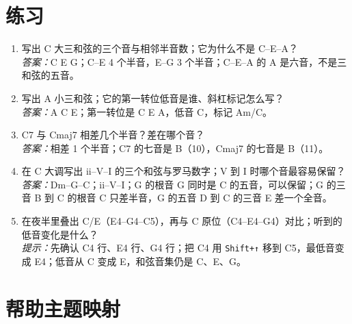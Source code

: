 \section{练习}


\begin{exercise}
\begin{enumerate}
  \item 写出 C 大三和弦的三个音与相邻半音数；它为什么不是 C–E–A？\\
  \emph{答案：}C E G；C–E 4 个半音，E–G 3 个半音；C–E–A 的 A 是六音，不是三和弦的五音。

  \item 写出 A 小三和弦；它的第一转位低音是谁、斜杠标记怎么写？\\
  \emph{答案：}A C E；第一转位是 C E A，低音 C，标记 Am/C。

  \item C7 与 Cmaj7 相差几个半音？差在哪个音？\\
  \emph{答案：}相差 1 个半音；C7 的七音是 B\flatsym（10），Cmaj7 的七音是 B（11）。

  \item 在 C 大调写出 ii–V–I 的三个和弦与罗马数字；V 到 I 时哪个音最容易保留？\\
  \emph{答案：}Dm–G–C；ii–V–I；G 的根音 G 同时是 C 的五音，可以保留；G 的三音 B 到 C 的根音 C 只差半音，G 的五音 D 到 C 的三音 E 差一个全音。

  \item 在夜半里叠出 C/E（E4–G4–C5），再与 C 原位（C4–E4–G4）对比；听到的低音变化是什么？\\
  \emph{提示：}先确认 C4 行、E4 行、G4 行；把 C4 用 \texttt{Shift+↑} 移到 C5，最低音变成 E4；低音从 C 变成 E，和弦音集仍是 C、E、G。
\end{enumerate}
\end{exercise}

\section{帮助主题映射}

